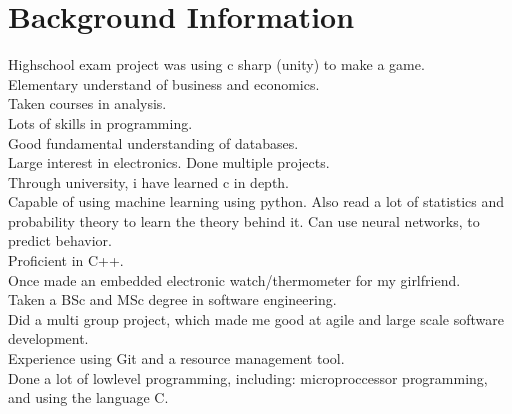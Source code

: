 \section*{Background Information}
Highschool exam project was using c sharp (unity) to make a game.\\Elementary understand of business and economics.\\Taken courses in analysis.\\Lots of skills in programming.\\Good fundamental understanding of databases.\\Large interest in electronics. Done multiple projects.\\Through university, i have learned c in depth.\\Capable of using machine learning using python. Also read a lot of statistics and probability theory to learn the theory behind it. Can use neural networks, to predict behavior.\\Proficient in C++.\\Once made an embedded electronic watch/thermometer for my girlfriend.\\Taken a BSc and MSc degree in software engineering.\\Did a multi group project, which made me good at agile and large scale software development.\\Experience using Git and a resource management tool.\\Done a lot of lowlevel programming, including: microproccessor programming, and using the language C.\\
